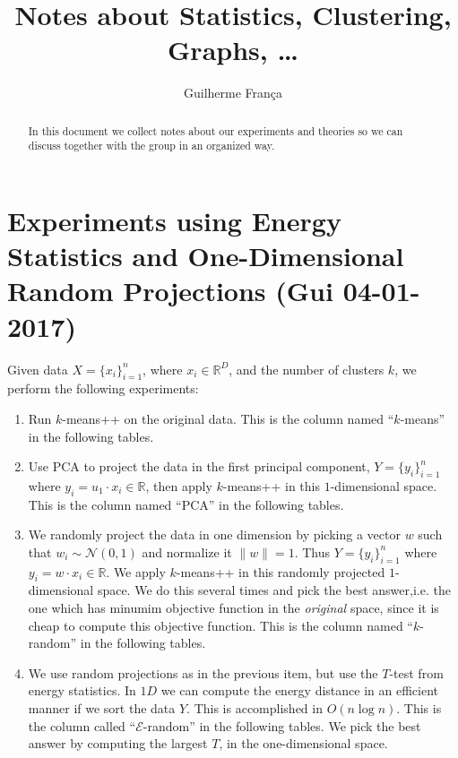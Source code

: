 \documentclass[aps,preprint,nofootinbib,floatfix]{revtex4-1}
\begin{document}
\title{Notes about Statistics, Clustering, Graphs, \ldots}

\author{Guilherme Fran\c ca}

\begin{abstract}
In this document we collect notes about our experiments and theories
so we can discuss together with the group in an organized way.
\end{abstract}

\maketitle


\section{Experiments using Energy Statistics and One-Dimensional 
Random Projections (Gui 04-01-2017)}

Given data $X=\{ x_i \}_{i=1}^{n}$, where $x_i \in \mathbb{R}^{D}$, 
and the number of clusters $k$, we perform the following experiments:
\begin{enumerate}
\item Run $k$-means++ 
on the original data. This is the column named 
``$k$-means'' in the following tables.
\item Use PCA to 
project the data in the first principal component, 
$Y=\{ y_i \}_{i=1}^n$ where $y_i = u_{1}\cdot x_i \in \mathbb{R}$, then
apply $k$-means++ in this $1$-dimensional space. This is the column named
``PCA'' in the following tables.
\item We randomly project the data in one dimension by picking a vector
$w$ such that $w_i \sim \mathcal{N}(0,1)$ and normalize it $\| w \|=1$.
Thus $Y = \{y_i\}_{i=1}^n $ where $y_i = w\cdot x_i \in \mathbb{R}$. 
We apply $k$-means++ in this randomly projected
$1$-dimensional space. We do this several times and pick the best answer,i.e.
the one which has minumim objective function in the \emph{original} space,
since it is cheap to compute this objective function.
This is the column named ``$k$-random'' in the following tables.
\item We use random projections as in the previous item, but use the $T$-test
from energy statistics. In $1D$ we can compute the energy distance in an
efficient manner if we sort the data $Y$. This is accomplished in
$O(n\log n)$. This is the column called
``$\mathcal{E}$-random'' in the following tables. We pick the best answer
by computing the largest $T$, in the one-dimensional space.
\end{enumerate}
\end{document}
